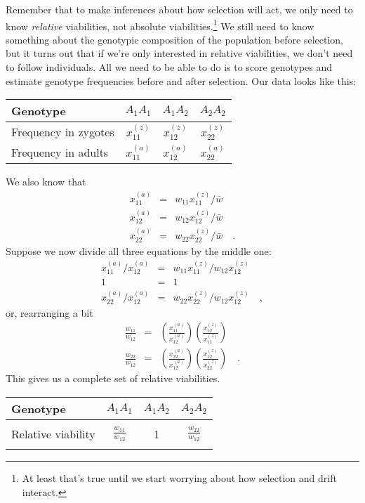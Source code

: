 Remember that to make inferences about how selection will act, we only
need to know {\it relative\/} viabilities, not absolute
viabilities.\footnote{At least that's true until we start worrying
  about how selection and drift interact.} We still need to know
something about the genotypic composition of the population before
selection, but it turns out that if we're only interested in relative
viabilities, we don't need to follow individuals. All we need to be
able to do is to score genotypes and estimate genotype frequencies
before and after selection. Our data looks like this:
\begin{center}
\begin{tabular}{l|ccc}
\hline\hline
Genotype & $A_1A_1$ & $A_1A_2$ & $A_2A_2$ \\
\hline
Frequency in zygotes & $x_{11}^{(z)}$ & $x_{12}^{(z)}$ &
$x_{22}^{(z)}$ \\
Frequency in adults  & $x_{11}^{(a)}$ & $x_{12}^{(a)}$ &
$x_{22}^{(a)}$ \\
\hline
\end{tabular}
\end{center}
We also know that
\begin{eqnarray*}
x_{11}^{(a)} &=& w_{11}x_{11}^{(z)}/\bar w \\
x_{12}^{(a)} &=& w_{12}x_{12}^{(z)}/\bar w \\
x_{22}^{(a)} &=& w_{22}x_{22}^{(z)}/\bar w \quad .
\end{eqnarray*}
Suppose we now divide all three equations by the middle one:
\begin{eqnarray*}
x_{11}^{(a)}/x_{12}^{(a)} &=& w_{11}x_{11}^{(z)}/w_{12}x_{12}^{(z)} \\
1 &=& 1 \\
x_{22}^{(a)}/x_{12}^{(a)} &=& w_{22}x_{22}^{(z)}/w_{12}x_{12}^{(z)} \quad ,
\end{eqnarray*}
or, rearranging a bit
\begin{eqnarray*}
\frac{w_{11}}{w_{12}} &=& \left(\frac{x_{11}^{(a)}}{x_{12}^{(a)}}\right)
                          \left(\frac{x_{12}^{(z)}}{x_{11}^{(z)}}\right) \\
\frac{w_{22}}{w_{12}} &=& \left(\frac{x_{22}^{(a)}}{x_{12}^{(a)}}\right)
                          \left(\frac{x_{12}^{(z)}}{x_{22}^{(z)}}\right)
\quad .
\end{eqnarray*}
This gives us a complete set of relative viabilities.
\begin{center}
\begin{tabular}{l|ccc}
\hline\hline
Genotype & $A_1A_1$ & $A_1A_2$ & $A_2A_2$ \\
\hline
\\
Relative viability & $\frac{w_{11}}{w_{12}}$ & 1 &
$\frac{w_{22}}{w_{12}}$ \\
\\
\hline
\end{tabular}
\end{center}

